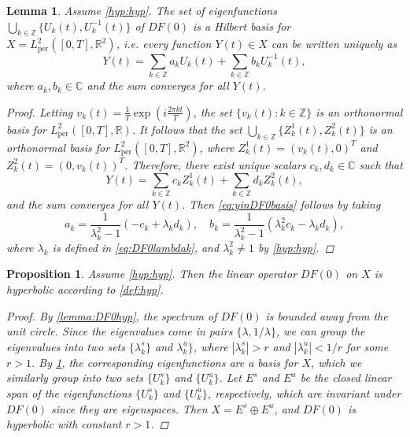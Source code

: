 \documentclass[12pt,reqno]{amsart}
\def\R{{\mathbb R}}
\def\C{{\mathbb C}}
\def\Z{{\mathbb Z}}
\def\per{\textrm{per}}
\newtheorem{lemma}{Lemma}
\newtheorem{proposition}{Proposition}
\begin{document}
\begin{lemma}\label{lemma:DF0basis}
Assume \cref{hyp:hyp}. The set of eigenfunctions $\bigcup_{k \in \Z} \{U_k(t) , U_k^{-1}(t) \}$ of $DF(0)$ is a Hilbert basis for $X = L^2_\per([0,T],\R^2)$, i.e. every function $Y(t) \in X$ can be written uniquely as
\begin{equation}\label{eq:yinDF0basis}
Y(t) = \sum_{k \in \Z} a_k U_k(t) + \sum_{k \in \Z} b_k U^{-1}_k(t),
\end{equation}
where $a_k, b_k \in \C$ and the sum converges for all $Y(t)$.
\begin{proof}
Letting $v_k(t) = \frac{1}{T} \exp\left( i \frac{2 \pi k t}{T} \right)$, the set $\{ v_k(t) : k \in \Z \}$ is an orthonormal basis for $L^2_\per([0,T],\R)$. It follows that the set $\bigcup_{k \in \Z} \{Z^1_k(t) , Z^2_k(t) \}$ is an orthonormal basis for $L^2_\per([0,T],\R^2)$, where $Z^1_k(t) = (v_k(t), 0)^T$ and $Z^2_k(t) = (0, v_k(t))^T$. Therefore, there exist unique scalars $c_k, d_k \in \C$ such that
\begin{equation*}
Y(t) = \sum_{k \in \Z} c_k Z^1_k(t) + \sum_{k \in \Z} d_k Z^2_k(t),
\end{equation*}
and the sum converges for all $Y(t)$. Then \cref{eq:yinDF0basis} follows by taking
\[
a_k = \frac{1}{\lambda_k^2 - 1}\left(-c_k + \lambda_k d_k \right), \quad
b_k = \frac{1}{\lambda_k^2 - 1}\left( \lambda_k^2 c_k - \lambda_k d_k \right),
\]
where $\lambda_k$ is defined in \cref{eq:DF0lambdak}, and $\lambda_k^2 \neq 1$ by \cref{hyp:hyp}.
\end{proof}
\end{lemma}

\begin{proposition}\label{prop:DF0hyp}
Assume \cref{hyp:hyp}. Then the linear operator $DF(0)$ on $X$ is hyperbolic according to \cref{def:hyp}.
\begin{proof}
By \cref{lemma:DF0hyp}, the spectrum of $DF(0)$ is bounded away from the unit circle. Since the eigenvalues come in pairs $\{\lambda, 1/\lambda\}$, we can group the eigenvalues into two sets $\{\lambda_k^s\}$ and $\lambda_k^u\}$, where $|\lambda_k^s| > r$ and $|\lambda_k^u| < 1/r$ for some $r>1$. By \cref{lemma:DF0basis}, the corresponding eigenfunctions are a basis for $X$, which we similarly group into two sets $\{U_k^s\}$ and $\{U_k^u\}$. Let $E^s$ and $E^u$ be the closed linear span of the eigenfunctions $\{U_k^s\}$ and $\{U_k^u\}$, respectively, which are invariant under $DF(0)$ since they are eigenspaces. Then $X = E^s \oplus E^u$, and $DF(0)$ is hyperbolic with constant $r>1$.
\end{proof}
\end{proposition}
\end{document}
